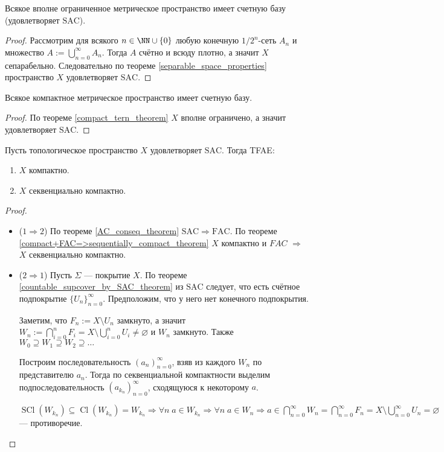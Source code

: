 \documentclass[12pt,a4paper]{article}
\DeclareMathOperator{\Cl}{Cl}
\DeclareMathOperator{\SCl}{SCl}
\newcommand{\FAC}{\ensuremath{\mathrm{FAC}}\xspace}
\newcommand{\SAC}{\ensuremath{\mathrm{SAC}}\xspace}
\begin{document}
    \begin{theorem}
        Всякое вполне ограниченное метрическое пространство имеет счетную базу (удовлетворяет \SAC).
    \end{theorem}

    \begin{proof}
        Рассмотрим для всякого $n \in \NN \cup \{0\}$ любую конечную $1/2^n$-сеть $A_n$ и множество $A := \bigcup_{n=0}^\infty A_n$. Тогда $A$ счётно и всюду плотно, а значит $X$ сепарабельно. Следовательно по теореме \ref{separable_space_properties} пространство $X$ удовлетворяет \SAC.
    \end{proof}

    \begin{corollary}
        Всякое компактное метрическое пространство имеет счетную базу.
    \end{corollary}

    \begin{proof}
        По теореме \ref{compact_tern_theorem} $X$ вполне ограничено, а значит удовлетворяет \SAC.
    \end{proof}

    \begin{theorem}
        Пусть топологическое пространство $X$ удовлетворяет \SAC. Тогда TFAE:
        \begin{enumerate}
            \item $X$ компактно.
            \item $X$ секвенциально компактно.
        \end{enumerate}
    \end{theorem}

    \begin{proof}\ 
        \begin{itemize}
            \item ($1 \Rightarrow 2$) По теореме \ref{AC_conseq_theorem} $\SAC \Rightarrow \FAC$. По теореме \ref{compact+FAC=>sequentially_compact_theorem} $X$ компактно и $FAC$ $\Rightarrow$ $X$ секвенциально компактно.
            \item ($2 \Rightarrow 1$) Пусть $\Sigma$ --- покрытие $X$. По теореме \ref{countable_supcover_by_SAC_theorem} из \SAC следует, что есть счётное подпокрытие $\{U_n\}_{n=0}^\infty$. Предположим, что у него нет конечного подпокрытия.

            Заметим, что $F_n := X \setminus U_n$ замкнуто, а значит $W_n := \bigcap_{i=0}^n F_i = X \setminus \bigcup_{i=0}^n U_i \neq \varnothing$ и $W_n$ замкнуто. Также $W_0 \supseteq W_1 \supseteq W_2 \supseteq \dots$

            Построим последовательность $(a_n)_{n=0}^\infty$, взяв из каждого $W_n$ по представителю $a_n$. Тогда по секвенциальной компактности выделим подпоследовательность $(a_{k_n})_{n=0}^\infty$, сходящуюся к некоторому $a$.

            $\SCl(W_{k_n}) \subseteq \Cl(W_{k_n}) = W_{k_n} \Rightarrow \forall n\; a \in W_{k_n} \Rightarrow \forall n\; a \in W_n \Rightarrow a \in \bigcap_{n=0}^\infty W_n = \bigcap_{n=0}^\infty F_n = X \setminus \bigcup_{n=0}^\infty U_n = \varnothing$ --- противоречие.
        \end{itemize}
    \end{proof}
\end{document}
